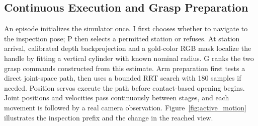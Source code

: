 \subsection{Continuous Execution and Grasp Preparation}
An episode initializes the simulator once. I first chooses whether to navigate
to the inspection pose; P then selects a permitted station or refuses. At
station arrival, calibrated depth backprojection and a gold-color RGB mask
localize the handle by fitting a vertical cylinder with known nominal radius.
G ranks the two grasp commands constructed from this estimate. Arm preparation
first tests a direct joint-space path, then uses a bounded RRT search
\citep{lavalle1998rrt} with 180 samples if needed. Position servos execute the
path before contact-based opening begins. Joint positions and velocities pass
continuously between stages, and each movement is followed by a real camera
observation. Figure~\ref{fig:active_motion} illustrates the inspection prefix
and the change in the reached view.
\ifshowfigures

\fi
